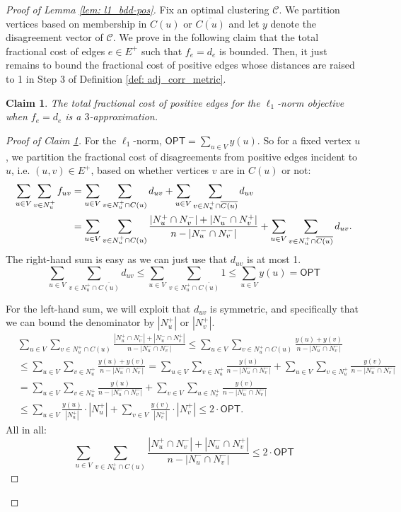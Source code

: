 \documentclass[11pt]{article}
\newtheorem{claim}{Claim}
\begin{document}
\begin{proof}[Proof of Lemma \ref{lem: l1_bdd-pos}]


Fix an optimal clustering $\mathcal{C}$. 
We partition vertices based on membership in $C(u)$ or $\overline{C(u)}$ and let $y$ denote the disagreement vector of $\mathcal{C}$. 
We prove in 
the following claim that the total fractional cost of edges $e \in E^+$ such that $f_e = d_e$ is bounded.  
Then, it just remains to bound the fractional cost of positive edges whose distances are raised to 1 in Step 3 of Definition \ref{def: adj_corr_metric}.
\begin{claim}\label{claim: l1-pos-cm}
The total fractional cost of positive edges for the $\ell_1$-norm objective when
$f_e = d_e$ is a $3$-approximation. 
\end{claim}
\begin{proof}[Proof of Claim \ref{claim: l1-pos-cm}]
For the $\ell_1$-norm, $\textsf{OPT} = \sum_{u \in V} y(u)$.
So for a fixed vertex $u$,
we partition the fractional cost of disagreements from positive edges incident to $u$, i.e. $(u,v) \in E^+$, based on whether vertices $v$ are in $C(u)$ or not:
\begin{align*}
    \sum_{u \in V} \sum_{v \in N_u^+} f_{uv}
    &=  \sum_{u \in V}\sum_{v \in N_u^+ \cap C(u)} d_{uv}+ \sum_{u \in V}\sum_{v \in N_u^+ \cap \overline{C(u)}} d_{uv} \\
    &= \sum_{u \in V}\sum_{v \in N_u^+ \cap C(u)} \frac{|N_u^+ \cap N_v^-| + |N_u^- \cap N_v^+|}{n-|N_u^- \cap N_v^-|} + \sum_{u \in V}\sum_{v \in N_u^+ \cap \overline{C(u)}} d_{uv}. \notag 
\end{align*}
The right-hand sum is easy as we can just use that $d_{uv}$ is at most 1. 
$$\boxed{\sum_{u \in V}\sum_{v \in N_u^+ \cap \overline{C(u)}} d_{uv} \leq \sum_{u \in V}\sum_{v \in N_u^+ \cap \overline{C(u)}} 1 \leq \sum_{u \in V} y(u) = \textsf{OPT}}
$$

For the left-hand sum, we will exploit that $d_{uv}$ is symmetric, and specifically that we can bound the denominator by $|N_u^+|$ or $|N_v^+|$.  
\begin{align*}
    &\sum_{u \in V}\sum_{v \in N_u^+ \cap C(u)} \frac{|N_u^+ \cap N_v^-| + |N_u^- \cap N_v^+|}{n-|N_u^- \cap N_v^-|}
    \leq \sum_{u \in V} \sum_{v \in N_u^+ \cap C(u)}\frac{y(u) + y(v)}{n-|N_u^- \cap N_v^-|}\\
    &\leq \sum_{u \in V} \sum_{v \in N_u^+} \frac{y(u) + y(v)}{n-|N_u^- \cap N_v^-|} 
    = \sum_{u \in V} \sum_{v \in N_u^+} \frac{y(u)}{n-|N_u^- \cap N_v^-|} + \sum_{u \in V} \sum_{v \in N_u^+} \frac{y(v)}{n-|N_u^- \cap N_v^-|}\\
    &= \sum_{u \in V} \sum_{v \in N_u^+} \frac{y(u)}{n-|N_u^- \cap N_v^-|} + \sum_{v \in V} \sum_{u \in N_v^+} \frac{y(v)}{n-|N_u^- \cap N_v^-|} \\
    &\leq \sum_{u \in V} \frac{y(u)}{|N_u^+|} \cdot |N_u^+| + \sum_{v \in V} \frac{y(v)}{|N_v^+|} \cdot |N_v^+| \leq 2\cdot \textsf{OPT}.
\end{align*}
All in all:
$$
    \boxed{\sum_{u \in V}\sum_{v \in N_u^+ \cap C(u)} \frac{|N_u^+ \cap N_v^-| + |N_u^- \cap N_v^+|}{n-|N_u^- \cap N_v^-|}
    \leq 2\cdot \textsf{OPT}}
$$
\end{proof}



\end{proof}
\end{document}
